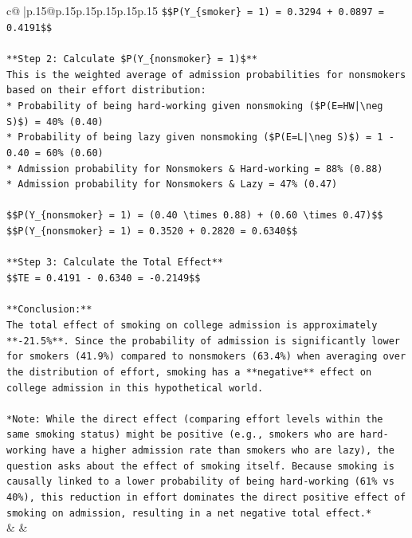 \documentclass{article}
\begin{document}
{\begin{supertabular}{c@{$\;$}|p{.15\linewidth}@{}p{.15\linewidth}p{.15\linewidth}p{.15\linewidth}p{.15\linewidth}p{.15\linewidth}}
{{{\texttt{\$\$P(Y\_\{smoker\} = 1) = 0.3294 + 0.0897 = 0.4191\$\$} \\
\\ 
\texttt{**Step 2: Calculate \$P(Y\_\{nonsmoker\} = 1)\$**} \\
\texttt{This is the weighted average of admission probabilities for nonsmokers based on their effort distribution:} \\
\texttt{*   Probability of being hard{-}working given nonsmoking (\$P(E=HW|\textbackslash{}neg S)\$) = 40\% (0.40)} \\
\texttt{*   Probability of being lazy given nonsmoking (\$P(E=L|\textbackslash{}neg S)\$) = 1 {-} 0.40 = 60\% (0.60)} \\
\texttt{*   Admission probability for Nonsmokers \& Hard{-}working = 88\% (0.88)} \\
\texttt{*   Admission probability for Nonsmokers \& Lazy = 47\% (0.47)} \\
\\ 
\texttt{\$\$P(Y\_\{nonsmoker\} = 1) = (0.40 \textbackslash{}times 0.88) + (0.60 \textbackslash{}times 0.47)\$\$} \\
\texttt{\$\$P(Y\_\{nonsmoker\} = 1) = 0.3520 + 0.2820 = 0.6340\$\$} \\
\\ 
\texttt{**Step 3: Calculate the Total Effect**} \\
\texttt{\$\$TE = 0.4191 {-} 0.6340 = {-}0.2149\$\$} \\
\\ 
\texttt{**Conclusion:**} \\
\texttt{The total effect of smoking on college admission is approximately **{-}21.5\%**. Since the probability of admission is significantly lower for smokers (41.9\%) compared to nonsmokers (63.4\%) when averaging over the distribution of effort, smoking has a **negative** effect on college admission in this hypothetical world.} \\
\\ 
\texttt{*Note: While the direct effect (comparing effort levels within the same smoking status) might be positive (e.g., smokers who are hard{-}working have a higher admission rate than smokers who are lazy), the question asks about the effect of smoking itself. Because smoking is causally linked to a lower probability of being hard{-}working (61\% vs 40\%), this reduction in effort dominates the direct positive effect of smoking on admission, resulting in a net negative total effect.*} \\
            }
        }
    }
    & & \\ \\


\end{supertabular}}
\end{document}
